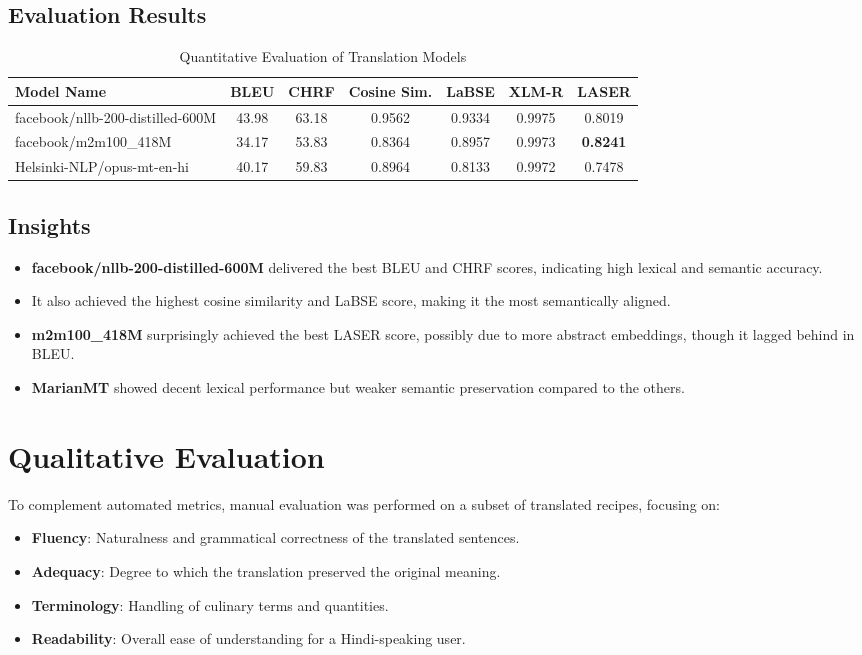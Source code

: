 \documentclass[letterpaper,11pt]{report}
\begin{document}
\subsection*{Evaluation Results}

\begin{table}[H]
\centering
\caption{Quantitative Evaluation of Translation Models}
\begin{tabular}{|l|c|c|c|c|c|c|}
\hline
\textbf{Model Name} & \textbf{BLEU} & \textbf{CHRF} & \textbf{Cosine Sim.} & \textbf{LaBSE} & \textbf{XLM-R} & \textbf{LASER} \\
\hline
facebook/nllb-200-distilled-600M & 43.98 & 63.18 & 0.9562 & 0.9334 & 0.9975 & 0.8019 \\
facebook/m2m100\_418M & 34.17 & 53.83 & 0.8364 & 0.8957 & 0.9973 & \textbf{0.8241} \\
Helsinki-NLP/opus-mt-en-hi & 40.17 & 59.83 & 0.8964 & 0.8133 & 0.9972 & 0.7478 \\
\hline
\end{tabular}
\end{table}

\subsection*{Insights}
\begin{itemize}
    \item \textbf{facebook/nllb-200-distilled-600M} delivered the best BLEU and CHRF scores, indicating high lexical and semantic accuracy.
    \item It also achieved the highest cosine similarity and LaBSE score, making it the most semantically aligned.
    \item \textbf{m2m100\_418M} surprisingly achieved the best LASER score, possibly due to more abstract embeddings, though it lagged behind in BLEU.
    \item \textbf{MarianMT} showed decent lexical performance but weaker semantic preservation compared to the others.
\end{itemize}

\section{Qualitative Evaluation}
To complement automated metrics, manual evaluation was performed on a subset of translated recipes, focusing on:

\begin{itemize}
    \item \textbf{Fluency}: Naturalness and grammatical correctness of the translated sentences.
    \item \textbf{Adequacy}: Degree to which the translation preserved the original meaning.
    \item \textbf{Terminology}: Handling of culinary terms and quantities.
    \item \textbf{Readability}: Overall ease of understanding for a Hindi-speaking user.
\end{itemize}
\end{document}
